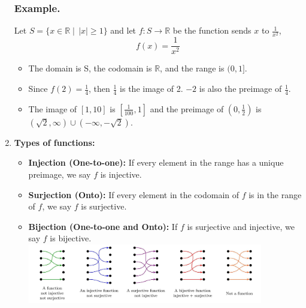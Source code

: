 \begin{enumerate}
            \subsubsection*{Example.}
            \qquad Let $S = \{x \in \mathbb{R} \mid \, |x| \ge 1\}$ and let $f: S \rightarrow \mathbb{R}$ be the function sends $x$ to \(\frac{1}{x^{2}}\),
                \[f(x) = \frac{1}{x^{2}}\]
            \vspace*{-0.2cm}
            \begin{itemize}
                \item The domain is S, the codomain is $\mathbb{R}$, and the range is \((0,1]\).
                \item Since \( f(2) = \frac{1}{4} \), then \( \frac{1}{4} \) is the image of 2. \(-2\) is also the preimage of \( \frac{1}{4} \).
                \item The image of \([1, 10]\) is \(\left[ \frac{1}{100}, 1 \right]\) and the preimage of \((0, \frac{1}{2})\) is \((\sqrt{2}, \infty) \cup (-\infty, -\sqrt{2})\).
            \end{itemize}
            \vspace*{0.5cm}
        \item \textbf{Types of functions:}
            \begin{itemize}
                \item \textbf{Injection (One-to-one):} If every element in the range has a unique preimage, we say $f$ is injective.
                \item \textbf{Surjection (Onto):} If every element in the codomain of $f$ is in the range of $f$, we say $f$ is surjective.
                \item \textbf{Bijection (One-to-one and Onto):} If $f$ is surjective and injective, we say $f$ is bijective.\\
                \includegraphics[width = 0.85\textwidth]{images/types-of-functions.jpeg}
            \end{itemize}

\end{enumerate}

